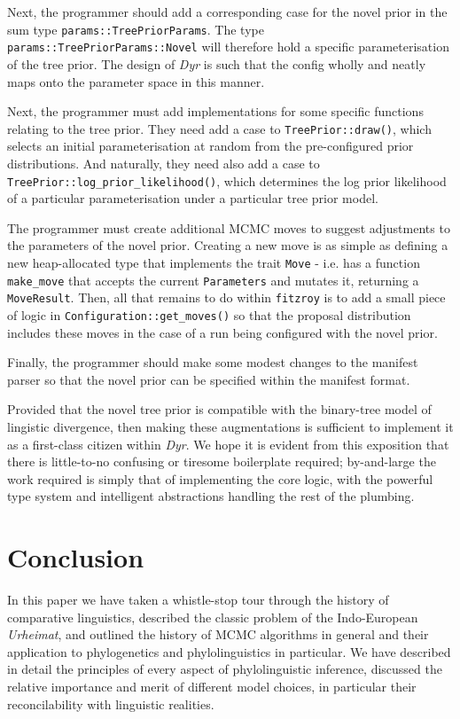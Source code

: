 \documentclass[10pt,journal,compsoc]{IEEEtran}
\begin{document}
Next, the programmer should add a corresponding case for the novel prior in the sum type \texttt{params::TreePriorParams}. The type \texttt{params::TreePriorParams::Novel} will therefore hold a specific parameterisation of the tree prior. The design of \textit{Dyr} is such that the config wholly and neatly maps onto the parameter space in this manner.

Next, the programmer must add implementations for some specific functions relating to the tree prior. They need add a case to \texttt{TreePrior::draw()}, which selects an initial parameterisation at random from the pre-configured prior distributions. And naturally, they need also add a case to \texttt{TreePrior::log\_prior\_likelihood()}, which determines the log prior likelihood of a particular parameterisation under a particular tree prior model.

The programmer must create additional MCMC moves to suggest adjustments to the parameters of the novel prior. Creating a new move is as simple as defining a new heap-allocated type that implements the trait \texttt{Move} - i.e. has a function \texttt{make\_move} that accepts the current \texttt{Parameters} and mutates it, returning a \texttt{MoveResult}. Then, all that remains to do within \texttt{fitzroy} is to add a small piece of logic in \texttt{Configuration::get\_moves()} so that the proposal distribution includes these moves in the case of a run being configured with the novel prior.

Finally, the programmer should make some modest changes to the manifest parser so that the novel prior can be specified within the manifest format.

Provided that the novel tree prior is compatible with the binary-tree model of lingistic divergence, then making these augmentations is sufficient to implement it as a first-class citizen within \textit{Dyr}. We hope it is evident from this exposition that there is little-to-no confusing or tiresome boilerplate required; by-and-large the work required is simply that of implementing the core logic, with the powerful type system and intelligent abstractions handling the rest of the plumbing.

\section{Conclusion}\label{sec:conclusion}

In this paper we have taken a whistle-stop tour through the history of comparative linguistics, described the classic problem of the Indo-European \textit{Urheimat}, and outlined the history of MCMC algorithms in general and their application to phylogenetics and phylolinguistics in particular. We have described in detail the principles of every aspect of phylolinguistic inference, discussed the relative importance and merit of different model choices, in particular their reconcilability with linguistic realities.
\end{document}
